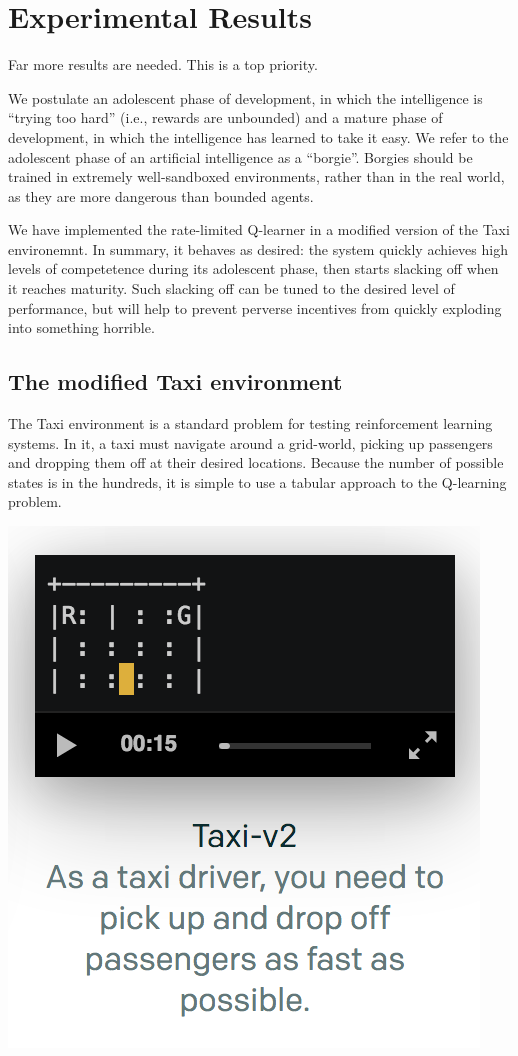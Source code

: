\documentclass{article}
\begin{document}
\section{Experimental Results}

Far more results are needed. This is a top priority.

We postulate an adolescent phase of development, in which the intelligence is
``trying too hard'' (i.e., rewards are unbounded) and a mature phase of
development, in which the intelligence has learned to take it easy. We refer to
the adolescent phase of an artificial intelligence as a ``borgie''. Borgies
should be trained in extremely well-sandboxed environments, rather than in the
real world, as they are more dangerous than bounded agents.

We have implemented the rate-limited Q-learner in a modified version of the
Taxi environemnt. In summary, it behaves as desired: the system quickly
achieves high levels of competetence during its adolescent phase, then starts
slacking off when it reaches maturity. Such slacking off can be tuned to the
desired level of performance, but will help to prevent perverse incentives from
quickly exploding into something horrible.

\subsection{The modified Taxi environment}

The Taxi environment is a standard problem for testing reinforcement learning
systems. In it, a taxi must navigate around a grid-world, picking up passengers
and dropping them off at their desired locations. Because the number of
possible states is in the hundreds, it is simple to use a tabular approach to
the Q-learning problem.

\includegraphics{taxi.png}
\end{document}

